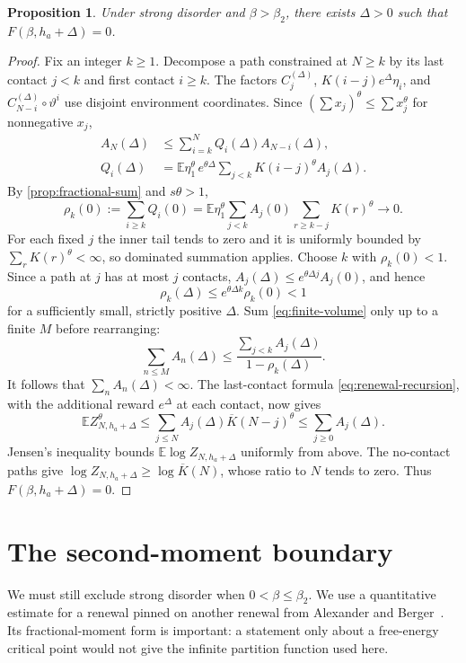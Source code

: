 \documentclass[11pt]{article}
\newtheorem{proposition}[proposition]{Proposition}
\theoremstyle{remark}
\numberwithin{equation}{section}
\newcommand{\E}{\mathbb E}
\begin{document}
\begin{proposition}\label{prop:positive-field}
Under strong disorder and $\beta>\beta_2$, there exists $\Delta>0$ such
that $F(\beta,h_a+\Delta)=0$.
\end{proposition}
\begin{proof}
Fix an integer $k\ge1$. Decompose a path constrained at $N\ge k$ by its
last contact $j<k$ and first contact $i\ge k$. The factors
$C_j^{(\Delta)}$, $K(i-j)e^\Delta\eta_i$, and
$C_{N-i}^{(\Delta)}\circ\vartheta^i$ use disjoint environment coordinates.
Since $(\sum x_j)^\theta\le\sum x_j^\theta$ for nonnegative $x_j$,
\begin{align}
 A_N(\Delta)&\le\sum_{i=k}^N Q_i(\Delta)A_{N-i}(\Delta),
 \label{eq:finite-volume}\\
 Q_i(\Delta)&=\E\eta_1^\theta\,e^{\theta\Delta}
     \sum_{j<k}K(i-j)^\theta A_j(\Delta).
 \nonumber
\end{align}
By \cref{prop:fractional-sum} and $s\theta>1$,
\[
 \rho_k(0):=\sum_{i\ge k}Q_i(0)
 =\E\eta_1^\theta\sum_{j<k}A_j(0)
                         \sum_{r\ge k-j}K(r)^\theta\longrightarrow0.
\]
For each fixed $j$ the inner tail tends to zero and it is uniformly bounded
by $\sum_rK(r)^\theta<\infty$, so dominated summation applies.
Choose $k$ with $\rho_k(0)<1$. Since a path at $j$ has at most $j$
contacts, $A_j(\Delta)\le e^{\theta\Delta j}A_j(0)$, and hence
\[
 \rho_k(\Delta)\le e^{\theta\Delta k}\rho_k(0)<1
\]
for a sufficiently small, strictly positive $\Delta$.
Sum \eqref{eq:finite-volume} only up to a finite $M$ before rearranging:
\[
 \sum_{n\le M}A_n(\Delta)
 \le\frac{\sum_{j<k}A_j(\Delta)}{1-\rho_k(\Delta)}.
\]
It follows that $\sum_nA_n(\Delta)<\infty$.
The last-contact formula \eqref{eq:renewal-recursion}, with the additional
reward $e^\Delta$ at each contact, now gives
\[
 \E Z_{N,h_a+\Delta}^{\theta}
 \le\sum_{j\le N}A_j(\Delta)\overline K(N-j)^\theta
 \le\sum_{j\ge0}A_j(\Delta).
\]
Jensen's inequality bounds $\E\log Z_{N,h_a+\Delta}$ uniformly from above.
The no-contact paths give $\log Z_{N,h_a+\Delta}\ge\log\overline K(N)$,
whose ratio to $N$ tends to zero. Thus $F(\beta,h_a+\Delta)=0$.
\end{proof}

\section{The second-moment boundary}\label{sec:boundary}

We must still exclude strong disorder when $0<\beta\le\beta_2$.
We use a quantitative estimate for a renewal pinned on another renewal
from Alexander and Berger~\cite{AB}. Its fractional-moment form is important:
a statement only about a free-energy critical point would not give the
infinite partition function used here.
\end{document}
